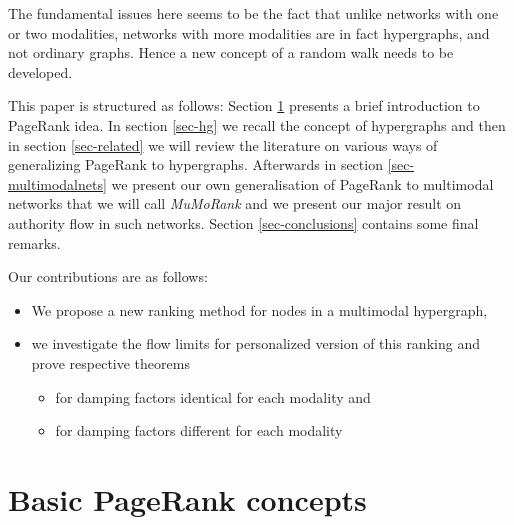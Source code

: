 \documentclass{fundam}
\begin{document}
The fundamental issues here seems to be the fact that unlike networks with one or two modalities, networks with more modalities are in fact hypergraphs, and not ordinary graphs. Hence a new concept of a random walk needs to be developed.

This paper is structured as follows:
%
Section \ref{sec:pagerank}  presents a brief introduction to PageRank idea.
%
In section \ref{sec-hg} we recall the concept of hypergraphs and then in section \ref{sec-related} we will review the literature on various ways of generalizing PageRank to hypergraphs.
Afterwards in section \ref{sec-multimodalnets}
we present our own generalisation of PageRank to  multimodal networks that we will call \emph{MuMoRank} and we present our major result on authority flow in such networks.
Section \ref{sec-conclusions} contains some final remarks.

\medskip
Our contributions are as follows:
\begin{itemize}
\item We propose a new ranking method for nodes in a multimodal hypergraph,
\item we investigate the flow limits for personalized version of this ranking
and prove respective theorems

\begin{itemize}
\item for damping factors identical for each modality and
\item for damping factors different for each modality
\end{itemize}
\end{itemize}

\section{Basic PageRank concepts}\label{sec:pagerank}
\end{document}
